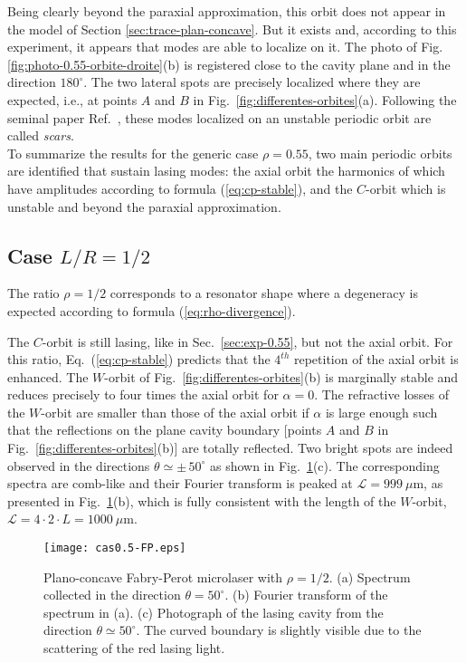 \documentclass[10pt]{iopart}
\begin{document}
Being clearly beyond the paraxial approximation, this orbit does not appear in the model of Section \ref{sec:trace-plan-concave}. But it exists and, according to this experiment, it appears that modes are able to localize on it. The photo of Fig. \ref{fig:photo-0.55-orbite-droite}(b) is registered close to the cavity plane and in the direction $180^{\circ}$. The two lateral spots are precisely localized where they are expected, i.e., at points $A$ and $B$ in Fig.~\ref{fig:differentes-orbites}(a). Following the seminal paper Ref.~\cite{heller1984}, these modes localized on an unstable periodic orbit are called \emph{scars}.\\

To summarize the results for the generic case $\rho=0.55$, two main periodic orbits are identified that sustain lasing modes: the axial orbit the harmonics of which have amplitudes according to formula (\ref{eq:cp-stable}), and the $C$-orbit which is unstable and beyond the paraxial approximation.



\subsection{Case $L/R = 1/2$} \label{sec:exp-0.5}

The ratio $\rho = 1/2$ corresponds to a resonator shape where a degeneracy is expected according to formula (\ref{eq:rho-divergence}). %

The $C$-orbit is still lasing, like in Sec.~\ref{sec:exp-0.55}, but not the axial orbit. For this ratio, Eq.~(\ref{eq:cp-stable}) predicts that the $4^{th}$ repetition of the axial orbit is enhanced. The $W$-orbit of Fig.~\ref{fig:differentes-orbites}(b) is marginally stable and reduces precisely to four times the axial orbit for $\alpha = 0$. The refractive losses of the $W$-orbit are smaller than those of the axial orbit if $\alpha$ is large enough such that the reflections on the plane cavity boundary [points $A$ and $B$ in Fig.~\ref{fig:differentes-orbites}(b)] are totally reflected. Two bright spots are indeed observed in the directions $\theta \simeq \pm \, 50^{\circ}$ as shown in Fig.~\ref{fig:spectre-0.5}(c). The corresponding spectra are comb-like and their Fourier transform is peaked at $\mathcal{L} = 999~\mu$m, as presented in Fig.~\ref{fig:spectre-0.5}(b), which is fully consistent with the length of the $W$-orbit, $\mathcal{L} = 4 \cdot 2 \cdot L = 1 000~\mu$m. %

\begin{figure}
\begin{center}
\texttt{[image: cas0.5-FP.eps]}
\end{center}
\caption{Plano-concave Fabry-Perot microlaser with $\rho = 1/2$. (a) Spectrum collected in the direction $\theta = 50^{\circ}$. (b) Fourier transform of the spectrum in (a). (c) Photograph of the lasing cavity from the direction $\theta \simeq 50^{\circ}$. The curved boundary is slightly visible due to the scattering of the red lasing light.}
\label{fig:spectre-0.5}
\end{figure}
\end{document}
